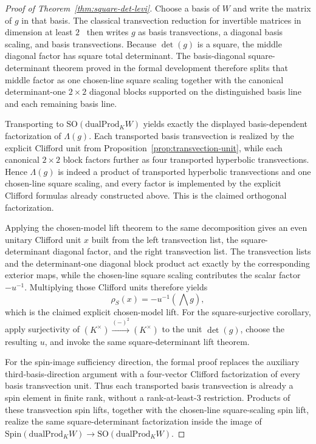 \documentclass[11pt,a4paper]{article}
\theoremstyle{plain}
\theoremstyle{definition}
\theoremstyle{remark}
\newcommand{\Spin}{\mathrm{Spin}}
\newcommand{\SO}{\mathrm{SO}}
\newcommand{\dualProd}{\mathrm{dualProd}}
\begin{document}
\begin{proof}[Proof of Theorem~\ref{thm:square-det-levi}]
Choose a basis of $W$ and write the matrix of $g$ in that basis. The classical
transvection reduction for invertible matrices in dimension at least
$2$~\cite[Ch.~IV]{Artin1957GeometricAlgebra} then writes $g$ as basis
transvections, a diagonal basis scaling, and basis transvections. Because
$\det(g)$ is a square, the middle diagonal factor has square total determinant.
The basis-diagonal square-determinant theorem proved in the formal development
therefore splits that middle factor as one chosen-line square scaling together
with the canonical determinant-one $2\times2$ diagonal blocks supported on the
distinguished basis line and each remaining basis line.

Transporting to $\SO(\dualProd_K W)$ yields exactly the displayed basis-dependent
factorization of $\Lambda(g)$. Each transported basis transvection is realized
by the explicit Clifford unit from Proposition~\ref{prop:transvection-unit},
while each canonical $2\times2$ block factors further as four transported
hyperbolic transvections. Hence $\Lambda(g)$ is indeed a product of transported
hyperbolic transvections and one chosen-line square scaling, and every factor is
implemented by the explicit Clifford formulas already constructed above. This is
the claimed orthogonal factorization.

Applying the chosen-model lift theorem to the same decomposition gives an even
unitary Clifford unit $x$ built from the left transvection list, the
square-determinant diagonal factor, and the right transvection list. The
transvection lists and the determinant-one diagonal block product act exactly by
the corresponding exterior maps, while the chosen-line square scaling
contributes the scalar factor $-u^{-1}$. Multiplying those Clifford units
therefore yields
\[
  \rho_S(x)=-u^{-1}(\bigwedge g),
\]
which is the claimed explicit chosen-model lift.
For the square-surjective corollary, apply surjectivity of
\((K^\times)\xrightarrow{(-)^2}(K^\times)\) to the unit \(\det(g)\), choose
the resulting $u$, and invoke the same square-determinant lift theorem.

For the spin-image sufficiency direction, the formal proof replaces the auxiliary
third-basis-direction argument with a four-vector Clifford factorization of every
basis transvection unit. Thus each transported basis transvection is already a
spin element in finite rank, without a rank-at-least-$3$ restriction. Products
of these transvection spin lifts, together with the chosen-line square-scaling
spin lift, realize the same square-determinant factorization inside the image of
\(\Spin(\dualProd_K W)\to\SO(\dualProd_K W)\).


\end{proof}
\end{document}
